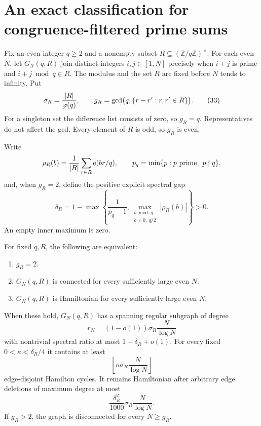 \section{An exact classification for congruence-filtered prime sums}
\label{sec:filters}
Fix an even integer \(q\geq2\) and a nonempty subset
\(R\subseteq(\mathbb Z/q\mathbb Z)^\times\).
For each even \(N\), let \(G_N(q,R)\) join distinct integers
\(i,j\in[1,N]\) precisely when \(i+j\) is prime and
\(i+j\bmod q\in R\).
The modulus and the set \(R\) are fixed before \(N\) tends to infinity.
Put
\[
 \sigma_R=\frac{|R|}{\varphi(q)},\qquad
 g_R=\gcd\bigl(q,\{r-r':r,r'\in R\}\bigr).
 \tag{33}
\]
For a singleton set the difference list consists of zero,
so \(g_R=q\). Representatives do not affect the gcd.
Every element of \(R\) is odd, so \(g_R\) is even.

Write
\[
 \rho_R(b)=\frac1{|R|}\sum_{r\in R}\mathrm e(br/q),\qquad
 p_q=\min\{p:p\ {\rm prime},\ p\nmid q\},
\]
and, when \(g_R=2\), define the positive explicit spectral gap
\[
 \delta_R=1-\max\left\{\frac1{p_q-1},
       \max_{\substack{b\bmod q\\b\ne0,\ q/2}}|\rho_R(b)|
                  \right\}>0.                              \tag{34}
\]
An empty inner maximum is zero.

\begin{theorem}
\label{thm:filterclassification}
For fixed \(q,R\), the following are equivalent:
\begin{enumerate}
\item \(g_R=2\).
\item \(G_N(q,R)\) is connected for every sufficiently large even \(N\).
\item \(G_N(q,R)\) is Hamiltonian for every sufficiently large even \(N\).
\end{enumerate}
When these hold, \(G_N(q,R)\) has a spanning regular subgraph
of degree
\[
 r_N=(1-o(1))\sigma_R\frac N{\log N}
\]
with nontrivial spectral ratio at most \(1-\delta_R+o(1)\).
For every fixed \(0<\kappa<\delta_R/4\) it contains at least
\[
 \left\lfloor\kappa\sigma_R\frac N{\log N}\right\rfloor
 \tag{35}
\]
edge-disjoint Hamilton cycles.
It remains Hamiltonian after arbitrary edge deletions of
maximum degree at most
\[
 \frac{\delta_R^2}{1000}\sigma_R\frac N{\log N}.              \tag{36}
\]
If \(g_R>2\), the graph is disconnected for every \(N\geq g_R\).
\end{theorem}

